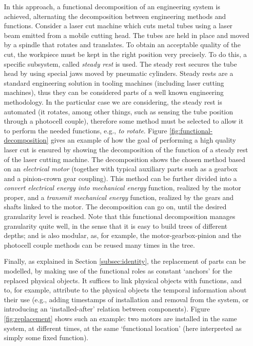 \documentclass[
]{ceurart}
\begin{document}
In this approach, a functional decomposition of an engineering system is achieved, alternating the decomposition between engineering methods and functions. 
Consider a laser cut machine which cuts metal tubes using a laser beam emitted from a mobile cutting head. The tubes are held in place and moved by a spindle that rotates and translates. To obtain an acceptable quality of the cut, the workpiece must be kept in the right position very precisely. To do this, a specific subsystem, called \textit{steady rest} is used. The steady rest secures the tube head by using special jaws moved by pneumatic cylinders. %
Steady rests are a standard engineering solution in tooling machines (including laser cutting machines), thus they can be considered parts of a well known engineering methodology. In the particular case we are considering, the steady rest is automated (it rotates, among other things, such as sensing the tube position through a photocell couple), therefore some method must be selected to allow it to perform the needed functions, e.g., \textit{to rotate}. Figure \ref{fig:functional-decomposition} gives an example of how the goal of performing a high quality laser cut is ensured by showing the decomposition of the function of a steady rest of the laser cutting machine.
The decomposition shows the chosen method based on an \textit{electrical motor} (together with typical auxiliary parts such as a gearbox and a pinion-crown gear coupling). This method can be further divided into a \textit{convert electrical energy into mechanical energy} function, realized by the motor proper, and a \textit{transmit mechanical energy} function, realized by the gears and shafts linked to the motor. The decomposition can go on, until the desired granularity level is reached. 
Note that this functional decomposition manages granularity quite well, in the sense that it is easy to build trees of different depths; and is also modular, as, for example, the motor-gearbox-pinion and the photocell couple methods can be reused many times in the tree.

Finally, as explained in Section \ref{subsec:identity}, the replacement of parts can be modelled, by making use of the functional roles as constant `anchors' for the replaced physical objects. It suffices to link physical objects with functions, and to, for example, attribute to the physical objects the temporal information about their use (e.g., adding timestamps of installation and removal from the system, or introducing an `installed-after' relation between components). Figure \ref{fig:replacement} shows such an example: two motors are installed in the same system, at different times, at the same `functional location' (here interpreted as simply some fixed function).
\end{document}

